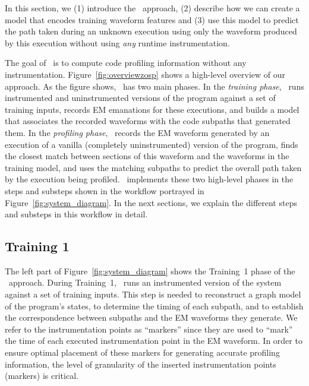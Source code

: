 In this section, we (1) introduce the \zop\ approach, (2) describe how we can create a model that encodes training waveform features and (3) use this model to predict the path taken during an unknown execution using only the waveform produced by this execution without using \textit{any} runtime instrumentation.


The goal of \zop\ is to compute code profiling information without any instrumentation. Figure~\ref{fig:overviewzosp} shows a high-level overview of our approach. As the figure shows, \zop\ has two main phases. In the \textit{training phase}, \zop\ runs instrumented and uninstrumented versions of the program against a set of training inputs, records EM emanations for these executions, and builds a model that associates the recorded waveforms with the code subpaths that generated them.  In the \textit{profiling phase}, \zop\ records the EM waveform generated by an execution of a vanilla (\ie completely uninstrumented) version of the program, finds the closest match between sections of this waveform and the waveforms in the training model, and uses the matching subpaths to predict the overall path taken by the execution being profiled. \zop\ implements these two high-level phases in the steps and substeps shown in the workflow portrayed in Figure~\ref{fig:system_diagram}. In the next sections, we explain the different steps and substeps in this workflow in detail.

\subsection{Training 1}
\label{sec:training-1}

The left part of Figure~\ref{fig:system_diagram} shows the Training~1 phase of the \zop\ approach.  During Training~1, \zop\ runs an instrumented version of the system against a set of training inputs.  This step is needed to reconstruct a graph model of the program's states, to determine the timing of each subpath, and to establish the correspondence between subpaths and the EM waveforms they generate.  We refer to the instrumentation points as \hbox{``markers''} since they are used to ``mark'' the time of each executed instrumentation point in the EM waveform. In order to ensure optimal placement of these markers for generating accurate profiling information, the level of granularity of the inserted instrumentation points (markers) is critical.

